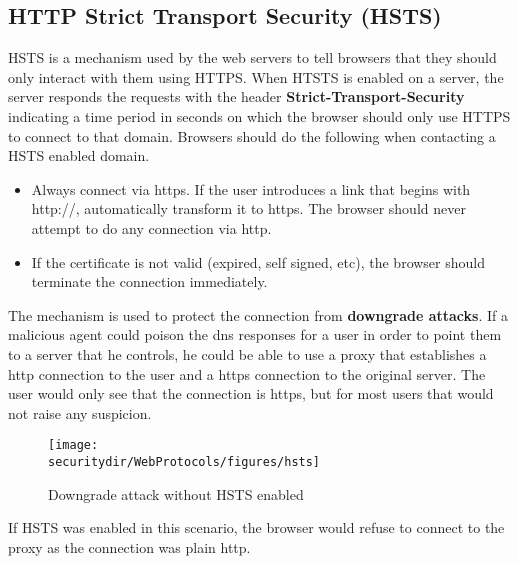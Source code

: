 \subsection{HTTP Strict Transport Security (HSTS)} 
HSTS is a mechanism used by the web servers to tell browsers that they should only interact with them using HTTPS. When HTSTS is enabled on a server, the server responds the requests with the header \textbf{Strict-Transport-Security} indicating a time period in seconds on which the browser should only use HTTPS to connect to that domain. Browsers should do the following when contacting a HSTS enabled domain.
\begin{itemize}
	\item Always connect via https. If the user introduces a link that begins with http://, automatically transform it to https. The browser should never attempt to do any connection via http.
	\item If the certificate is not valid (expired, self signed, etc), the browser should terminate the connection immediately.
\end{itemize}

The mechanism is used to protect the connection from \textbf{downgrade attacks}. If a malicious agent could poison the dns responses for a user in order to point them to a server that he controls, he could be able to use a proxy that establishes a http connection to the user and a https connection to the original server. The user would only see that the connection is https, but for most users that would not raise any suspicion.

\begin{figure}[htb]
	\begin{centering}
		\texttt{[image: \\securitydir/WebProtocols/figures/hsts]}
		\par
	\end{centering}
	\caption{\label{fig:hsts} Downgrade attack without HSTS enabled}
\end{figure}

If HSTS was enabled in this scenario, the browser would refuse to connect to the proxy as the connection was plain http. 